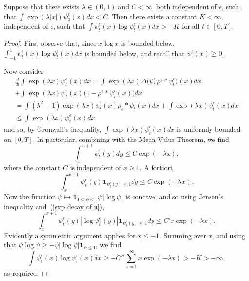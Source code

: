 \documentclass[EJP]{ejpecp} %
\newcommand{\ind}{\mathbf{1}}
\newcommand{\kernel}{\rho}  %
\newcommand{\smooth}[1]{\kernel_{#1} \! * \!}  %
\begin{document}
\begin{lemma}
\label{lower bound on ulogu}
	Suppose that there exists $\lambda\in (0,1)$ and $C<\infty$, both independent of
$\epsilon$, such that $\int \exp(\lambda |x|) \psi_0^\epsilon(x) dx<C$.
Then there exists
a constant $K<\infty$, independent of $\epsilon$, such that  
 $\int \psi_t^\epsilon(x)\log \psi_t^\epsilon (x)dx>-K$ for all $t\in [0,T]$. 
\end{lemma}
\begin{proof}
First observe that, since $x\log x$ is bounded below, 
$\int_{-1}^1\psi_t^\epsilon(x)\log\psi_t^\epsilon(x) dx$ is bounded below,
and recall that $\psi_t^\epsilon(x) \ge 0$.

Now consider 
\begin{multline}
\frac{d}{dt}\int \exp(\lambda x) \psi_t^\epsilon (x)dx
	= \int \exp(\lambda x)\Delta \big(\psi_t^\epsilon \, \rho^{\epsilon}*\psi_t^\epsilon\big)(x) dx
	\\
	+ \int \exp(\lambda x)\psi_t^\epsilon(x)\big(1-\rho^{\epsilon}*\psi_t^\epsilon(x)\big) dx
    \\
	= \int (\lambda^2-1)\exp(\lambda x) \psi_t^\epsilon(x) \smooth{\epsilon} \psi_t^\epsilon(x) dx 
	+ \int \exp(\lambda x)\psi_t^\epsilon(x) dx
    \\
    \leq \int \exp(\lambda x)\psi_t^\epsilon(x) dx,
\end{multline}
and so, by Gronwall's inequality, 
$\int \exp(\lambda x)\psi_t^\epsilon (x)dx$ is uniformly bounded on $[0,T]$.
In particular, combining with the Mean Value Theorem, we find 
\begin{equation*}
\int_x^{x+1}\psi_t^\epsilon(y)dy\leq C\exp(-\lambda x),
\end{equation*}
where the constant $C$ is independent of $x\geq1$.
A fortiori, 
\begin{equation}
\label{exp decay of u} 
\int_x^{x+1}\psi_t^\epsilon(y)\ind_{\psi_t^\epsilon(y)\leq 1}dy\leq C\exp(-\lambda x).
\end{equation}
Now the function $\psi\mapsto \ind_{0\leq \psi\leq 1}\psi|\log \psi|$ is concave, and so 
using Jensen's inequality and~(\ref{exp decay of u}),
\begin{equation*}
\int_x^{x+1}\psi_t^\epsilon(y)
|\log \psi_t^\epsilon (y)|\ind_{\psi_t^\epsilon(y)\leq 1}dy
\leq C'x \exp(-\lambda x).
\end{equation*}
Evidently a symmetric argument applies for $x\leq -1$.
Summing over $x$,
    and using that $\psi \log \psi \ge - \psi |\log \psi| \ind_{\psi \le 1}$,
we find
\begin{equation*}
\int \psi_t^\epsilon (x) \log \psi_t^\epsilon (x) dx
\geq -C''\sum_{x=1}^\infty x\exp(-\lambda x)>-K>-\infty,  
\end{equation*}
as required.
\end{proof}
\end{document}
